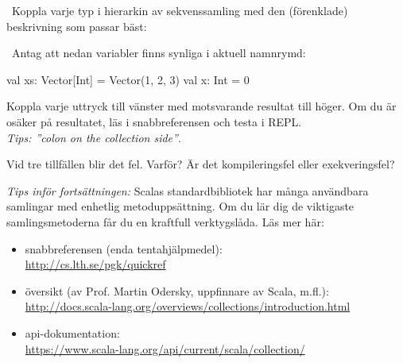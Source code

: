 \QUESTEND





\QUESTBEGIN

\Task \what~Koppla varje typ i hierarkin av sekvenssamling med den (förenklade) beskrivning som passar bäst:

\begin{ConceptConnections}

\end{ConceptConnections}

\SOLUTION

\TaskSolved \what

\begin{ConceptConnections}

\end{ConceptConnections}

\QUESTEND



\QUESTBEGIN

\Task \what~Antag att nedan variabler finns synliga i aktuell namnrymd:
\begin{Code}
val xs: Vector[Int] = Vector(1, 2, 3)
val x: Int = 0
\end{Code}

\Subtask Koppla varje uttryck till vänster med motsvarande resultat till höger. Om du är osäker på resultatet, läs i snabbreferensen och testa i REPL. \\\emph{Tips: ''colon on the collection side''}.

\begin{ConceptConnections}

\end{ConceptConnections}

\Subtask Vid tre tillfällen blir det fel. Varför? Är det kompileringsfel eller exekveringsfel?



\begin{framed}
\noindent\emph{Tips inför fortsättningen:}
Scalas standardbibliotek har många användbara samlingar med enhetlig metoduppsättning. Om du lär dig de viktigaste samlingsmetoderna får du en kraftfull verktygslåda. Läs mer här:

    \begin{itemize}%
      \item snabbreferensen (enda tentahjälpmedel): \\{\small\url{http://cs.lth.se/pgk/quickref}}
      \item översikt (av Prof. Martin Odersky, uppfinnare av Scala, m.fl.): \\
       {\small\url{http://docs.scala-lang.org/overviews/collections/introduction.html}}
      \item api-dokumentation:\\  {\small\url{https://www.scala-lang.org/api/current/scala/collection/}}
    \end{itemize}
\end{framed}



